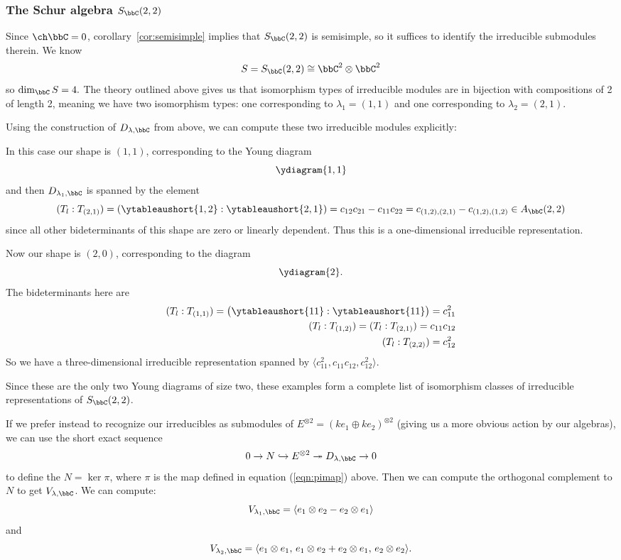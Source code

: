 \documentclass[12pt]{article}
\begin{document}
\subsubsection{The Schur algebra \texorpdfstring{$S_\bbC(2,2)$}{S(2,2)}}
Since $\ch\bbC=0$, corollary~\ref{cor:semisimple} implies that $S_\bbC(2,2)$ is semisimple, so it suffices to identify the irreducible submodules therein.
We know 
\[S=S_\bbC(2,2)\cong \bbC^2\otimes\bbC^2\]
so $\dim_\bbC S=4.$ The theory outlined above gives us that isomorphism types of irreducible modules are in bijection with compositions of 2 of length 2, meaning 
we have two isomorphism types: one corresponding to $\lambda_1=(1,1)$ and one corresponding to $\lambda_2=(2,1)$. 

Using the construction of $D_{\lambda,\bbC}$ from above, we can compute these two irreducible modules explicitly:

\begin{ex}[$\mathbf{\lambda_1=(1,1)}$]
 In this case our shape is $(1,1)$, corresponding to the Young diagram 
\[\ydiagram{1,1}\]
and then $D_{\lambda_1,\bbC}$ is spanned by the element
\[(T_l:T_{(2,1)})=\left(\ytableaushort{1,2}:\ytableaushort{2,1}\right)=c_{12}c_{21}-c_{11}c_{22}=c_{(1,2),(2,1)}-c_{(1,2),(1,2)}\in A_\bbC(2,2)\]
since all other bideterminants of this shape are zero or linearly dependent. Thus this is a one-dimensional irreducible representation.
\end{ex}
\begin{ex}[$\mathbf{\lambda_2=(2,0)}$]
Now our shape is $(2,0)$, corresponding to the diagram
\[\ydiagram{2}.\]
The bideterminants here are 
\begin{align*}
	(T_l:T_{(1,1)})=\big(\ytableaushort{1 1}:\ytableaushort{1 1}\big)=c_{11}^2\\
	(T_l:T_{(1,2)})=(T_l:T_{(2,1)})=c_{11}c_{12}\\
	(T_l:T_{(2,2)})=c_{12}^2
\end{align*}
So we have a three-dimensional irreducible representation spanned by $\langle c_{11}^2,c_{11}c_{12},c_{12}^2\rangle$.
\end{ex}
Since these are the only two Young diagrams of size two, these examples form a complete list of isomorphism classes of irreducible representations of $S_\bbC(2,2)$.

If we prefer instead to recognize our irreducibles as submodules of $E^{\otimes 2}=(k e_1\oplus k e_2)^{\otimes 2}$ (giving us a more obvious action by our algebras), 
we can use the short exact sequence 
\[0\to N\hookrightarrow E^{\otimes 2}\twoheadrightarrow D_{\lambda,\bbC}\to 0\]
to define the $N=\ker\pi$, where $\pi$ is the map defined in equation (\ref{eqn:pimap}) above.
Then we can compute the orthogonal complement to $N$ to get $V_{\lambda,\bbC}$.
We can compute:
\[V_{\lambda_1,\bbC}=\langle e_1\otimes e_2-e_2\otimes e_1\rangle\]
and
\[V_{\lambda_2,\bbC}=\langle e_1\otimes e_1, \,e_1\otimes e_2+e_2\otimes e_1, \,e_2\otimes e_2\rangle.\]
\end{document}
